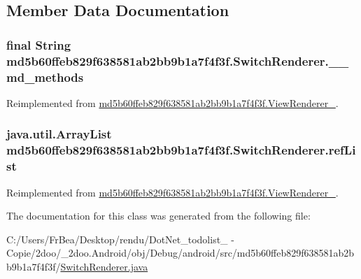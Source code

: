 \subsection{Member Data Documentation}
\hypertarget{classmd5b60ffeb829f638581ab2bb9b1a7f4f3f_1_1_switch_renderer_5d8d51148704e49b135709f942738f92}{
\subsubsection[{\_\-\_\-md\_\-methods}]{\setlength{\rightskip}{0pt plus 5cm}final String {\bf md5b60ffeb829f638581ab2bb9b1a7f4f3f.SwitchRenderer.\_\-\_\-md\_\-methods}}}
\label{classmd5b60ffeb829f638581ab2bb9b1a7f4f3f_1_1_switch_renderer_5d8d51148704e49b135709f942738f92}




Reimplemented from \hyperlink{classmd5b60ffeb829f638581ab2bb9b1a7f4f3f_1_1_view_renderer__2_80b609e3e4054c380887d4dc2907a875}{md5b60ffeb829f638581ab2bb9b1a7f4f3f.ViewRenderer\_}.\hypertarget{classmd5b60ffeb829f638581ab2bb9b1a7f4f3f_1_1_switch_renderer_d6c93485d20d2c459c3ad2829f699a70}{
\subsubsection[{refList}]{\setlength{\rightskip}{0pt plus 5cm}java.util.ArrayList {\bf md5b60ffeb829f638581ab2bb9b1a7f4f3f.SwitchRenderer.refList}}}
\label{classmd5b60ffeb829f638581ab2bb9b1a7f4f3f_1_1_switch_renderer_d6c93485d20d2c459c3ad2829f699a70}




Reimplemented from \hyperlink{classmd5b60ffeb829f638581ab2bb9b1a7f4f3f_1_1_view_renderer__2_6c151401977148a92c515e9c7de1aaf8}{md5b60ffeb829f638581ab2bb9b1a7f4f3f.ViewRenderer\_}.

The documentation for this class was generated from the following file:\begin{CompactItemize}
\item 
C:/Users/FrBea/Desktop/rendu/DotNet\_\-todolist\_ - Copie/2doo/\_\-2doo.Android/obj/Debug/android/src/md5b60ffeb829f638581ab2bb9b1a7f4f3f/\hyperlink{md5b60ffeb829f638581ab2bb9b1a7f4f3f_2_switch_renderer_8java}{SwitchRenderer.java}\end{CompactItemize}
